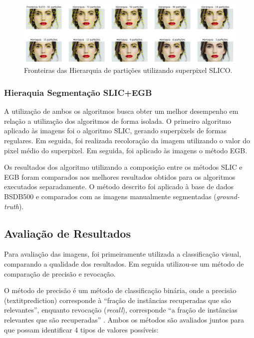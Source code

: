 \begin{document}
\begin{figure}[ht]
\centering
\includegraphics[width=1.\textwidth]{slic_hierarquia_particoes.png}
\caption{Fronteiras das Hierarquia de partições utilizando superpixel SLICO.}
\label{fig:hierarq_partit}
\end{figure}


\subsubsection{Hieraquia Segmentação SLIC+EGB} \label{sssec:hierq_segm_segb}

A utilização de ambos os algoritmos busca obter um melhor desempenho em relação a utilização  dos algoritmos de forma isolada. O primeiro algoritmo aplicado às imagens foi o algoritmo SLIC, gerando superpixels de formas regulares. Em seguida, foi realizada recoloração da imagem utilizando o valor do pixel médio do superpixel. Em seguida, foi aplicado às imagens o método EGB.

Os resultados dos algoritmo utilizando a composição entre os métodos SLIC e EGB foram comparados aos melhores resultados obtidos para os algoritmos executados separadamente. O método descrito foi aplicado à base de dados BSDB500 e comparados com as imagens manualmente segmentadas (\textit{ground-truth}).


\subsection{Avaliação de Resultados} \label{ssec:aval_resultados}

Para avaliação das imagens, foi primeiramente utilizada a classificação visual, comparando a qualidade dos resultados. Em seguida utilizou-se um método de comparação de precisão e revocação.

O método de precisão é um método de classificação binária, onde a precisão (textit{prediction}) corresponde à ``fração de instâncias recuperadas que são relevantes'', enquanto revocação (\textit{recall}), corresponde ``a fração de instâncias relevantes que são recuperadas'' \cite{WIKI_PREC_RECALL}. Ambos os métodos são avaliados juntos para que possam identificar 4 tipos de valores possíveis:
\end{document}
